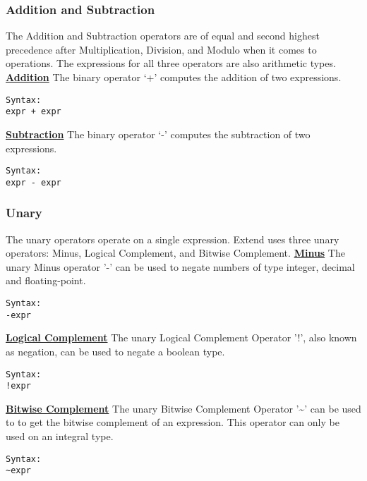 		\subsubsection{Addition and Subtraction}
			The Addition and Subtraction operators are of equal and second highest precedence after Multiplication, Division, and Modulo when it comes to operations. The expressions for all three operators are also arithmetic types.
			\newline
			\underline{\textbf{Addition}}\newline
			The binary operator ‘+’ computes the addition of two expressions. 
			\begin{lstlisting}
Syntax:
expr + expr 
			\end{lstlisting}
			\underline{\textbf{Subtraction}}\newline
			The binary operator ‘-’ computes the subtraction of two expressions. 
			\begin{lstlisting}
Syntax:
expr - expr 
			\end{lstlisting}
		\subsubsection{Unary}
			The unary operators operate on a single expression. Extend uses three unary operators: Minus, Logical Complement, and Bitwise Complement.
			\newline
			\underline{\textbf{Minus}}\newline
			The unary Minus operator '-' can be used to negate numbers of type integer, decimal and floating-point.
			\begin{lstlisting}
Syntax:
-expr 
			\end{lstlisting}
			\underline{\textbf{Logical Complement}}\newline
			The unary Logical Complement Operator '!', also known as negation, can be used to negate a boolean type.
			\begin{lstlisting}
Syntax:
!expr 
			\end{lstlisting}
			\underline{\textbf{Bitwise Complement}}\newline
			The unary Bitwise Complement Operator '\textasciitilde' can be used to to get the bitwise complement of an expression. This operator can only be used on an integral type. 
			\begin{lstlisting}
Syntax:
~expr 
			\end{lstlisting}


